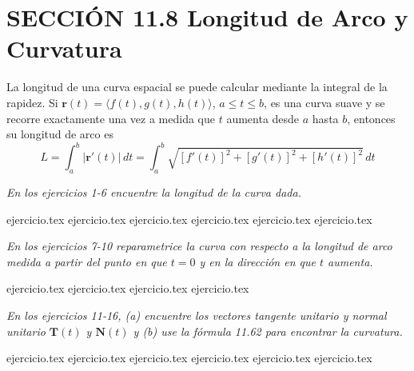 
\section*{SECCIÓN 11.8 \quad Longitud de Arco y Curvatura}

La longitud de una curva espacial se puede calcular mediante la integral de la rapidez. Si $\mathbf{r}(t) = \langle f(t), g(t), h(t) \rangle$, $a \leq t \leq b$, es una curva suave y se recorre exactamente una vez a medida que $t$ aumenta desde $a$ hasta $b$, entonces su longitud de arco es
\[
L = \int_a^b |\mathbf{r}'(t)| \, dt = \int_a^b \sqrt{[f'(t)]^2 + [g'(t)]^2 + [h'(t)]^2} \, dt
\]

\vspace{0.5cm}
\noindent\textit{En los ejercicios 1-6 encuentre la longitud de la curva dada.}

\begin{enumerate}
    {ejercicio.tex}
{ejercicio.tex}
{ejercicio.tex}
{ejercicio.tex}
{ejercicio.tex}
{ejercicio.tex}
\end{enumerate}

\vspace{0.3cm}
\noindent\textit{En los ejercicios 7-10 reparametrice la curva con respecto a la longitud de arco medida a partir del punto en que $t=0$ y en la dirección en que $t$ aumenta.}

\begin{enumerate}
    \setcounter{enumi}{6}
    {ejercicio.tex}
{ejercicio.tex}
{ejercicio.tex}
{ejercicio.tex}
\end{enumerate}

\vspace{0.3cm}
\noindent\textit{En los ejercicios 11-16, (a) encuentre los vectores tangente unitario y normal unitario $\mathbf{T}(t)$ y $\mathbf{N}(t)$ y (b) use la fórmula 11.62 para encontrar la curvatura.}

\begin{enumerate}
    \setcounter{enumi}{10}
    {ejercicio.tex}
{ejercicio.tex}
{ejercicio.tex}
{ejercicio.tex}
{ejercicio.tex}
{ejercicio.tex}
\end{enumerate}

